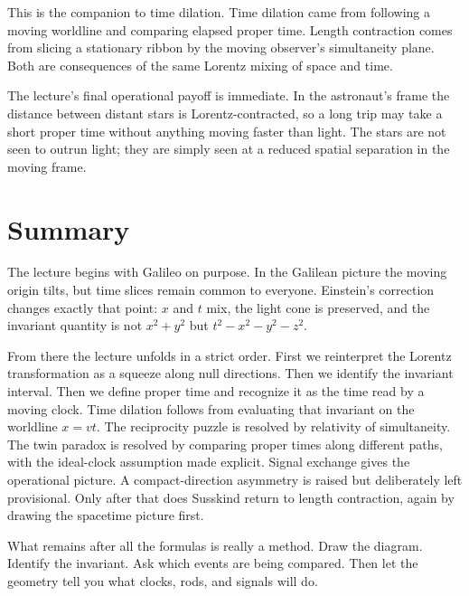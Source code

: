 This is the companion to time dilation. Time dilation came from following a moving worldline and comparing elapsed proper time. Length contraction comes from slicing a stationary ribbon by the moving observer's simultaneity plane. Both are consequences of the same Lorentz mixing of space and time.

The lecture's final operational payoff is immediate. In the astronaut's frame the distance between distant stars is Lorentz-contracted, so a long trip may take a short proper time without anything moving faster than light. The stars are not seen to outrun light; they are simply seen at a reduced spatial separation in the moving frame.

\section{Summary}

The lecture begins with Galileo on purpose. In the Galilean picture the moving origin tilts, but time slices remain common to everyone. Einstein's correction changes exactly that point: \(x\) and \(t\) mix, the light cone is preserved, and the invariant quantity is not \(x^2+y^2\) but \(t^2-x^2-y^2-z^2\).

From there the lecture unfolds in a strict order. First we reinterpret the Lorentz transformation as a squeeze along null directions. Then we identify the invariant interval. Then we define proper time and recognize it as the time read by a moving clock. Time dilation follows from evaluating that invariant on the worldline \(x=vt\). The reciprocity puzzle is resolved by relativity of simultaneity. The twin paradox is resolved by comparing proper times along different paths, with the ideal-clock assumption made explicit. Signal exchange gives the operational picture. A compact-direction asymmetry is raised but deliberately left provisional. Only after that does Susskind return to length contraction, again by drawing the spacetime picture first.

What remains after all the formulas is really a method. Draw the diagram. Identify the invariant. Ask which events are being compared. Then let the geometry tell you what clocks, rods, and signals will do.
